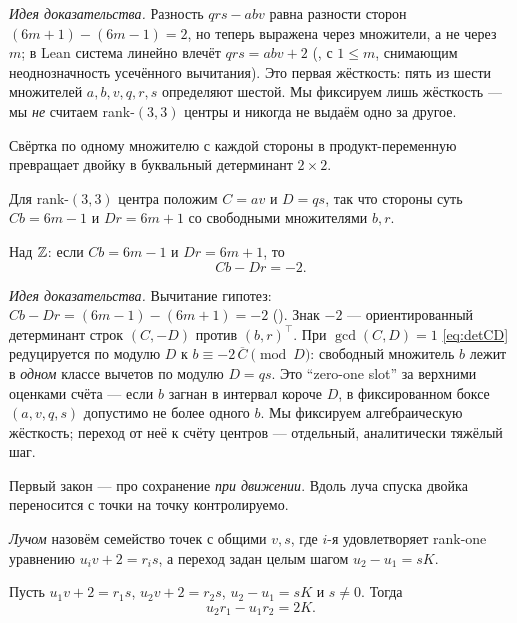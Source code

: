 \emph{Идея доказательства.} Разность $qrs-abv$ равна разности сторон $(6m+1)-(6m-1)=2$, но теперь
выражена через множители, а не через $m$; в Lean система линейно влечёт $qrs=abv+2$ (,
с $1\le m$, снимающим неоднозначность усечённого вычитания). Это первая жёсткость: пять из шести
множителей $a,b,v,q,r,s$ определяют шестой. Мы фиксируем лишь жёсткость --- мы \emph{не} считаем
rank-$(3,3)$ центры и никогда не выдаём одно за другое.

Свёртка по одному множителю с каждой стороны в продукт-переменную превращает двойку в буквальный
детерминант $2\times2$.

\begin{definition}\label{def:product-coords}
Для rank-$(3,3)$ центра положим $C=av$ и $D=qs$, так что стороны суть $Cb=6m-1$ и $Dr=6m+1$ со
свободными множителями $b,r$.
\end{definition}

\begin{theorem}\label{thm:det_law_CD}
\green{} Над $\mathbb{Z}$: если $Cb=6m-1$ и $Dr=6m+1$, то
\begin{equation}\label{eq:detCD}
Cb-Dr=-2.
\end{equation}
\end{theorem}

\emph{Идея доказательства.} Вычитание гипотез: $Cb-Dr=(6m-1)-(6m+1)=-2$ (). Знак $-2$ --- ориентированный детерминант строк $(C,-D)$ против $(b,r)^\top$. При
$\gcd(C,D)=1$ \cref{eq:detCD} редуцируется по модулю $D$ к $b\equiv-2\,\overline{C}\pmod D$:
свободный множитель $b$ лежит в \emph{одном} классе вычетов по модулю $D=qs$. Это ``zero-one slot''
за верхними оценками счёта --- если $b$ загнан в интервал короче $D$, в фиксированном боксе
$(a,v,q,s)$ допустимо не более одного $b$. Мы фиксируем алгебраическую жёсткость; переход от неё к
счёту центров --- отдельный, аналитически тяжёлый шаг.

Первый закон --- про сохранение \emph{при движении}. Вдоль луча спуска двойка переносится с точки
на точку контролируемо.

\begin{definition}\label{def:ray}
\emph{Лучом} назовём семейство точек с общими $v,s$, где $i$-я удовлетворяет rank-one уравнению
$u_i v+2=r_i s$, а переход задан целым шагом $u_2-u_1=sK$.
\end{definition}

\begin{theorem}\label{thm:det_collapse}
\green{} Пусть $u_1 v+2=r_1 s$, $u_2 v+2=r_2 s$, $u_2-u_1=sK$ и $s\ne 0$. Тогда
\begin{equation}\label{eq:detcollapse}
u_2 r_1-u_1 r_2=2K.
\end{equation}
\end{theorem}

